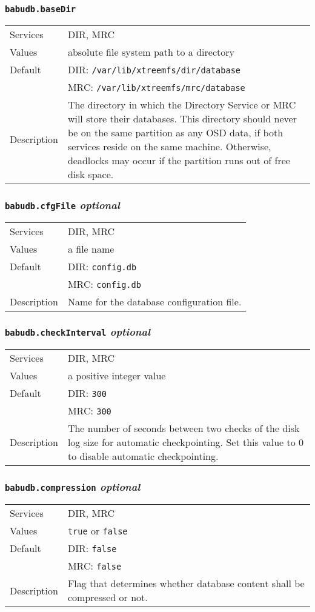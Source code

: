 \documentclass[a4paper,10pt]{book}
\begin{document}
\subsubsection{\texttt{babudb.baseDir}}
\begin{tabular}{lp{10cm}}
 Services & DIR, MRC\\
 Values   & absolute file system path to a directory\\
 Default  & DIR: \texttt{/var/lib/xtreemfs/dir/database}\\
          & MRC: \texttt{/var/lib/xtreemfs/mrc/database}\\
 Description & The directory in which the Directory Service or MRC will store their databases. This directory should never be on the same partition as any OSD data, if both services reside on the same machine. Otherwise, deadlocks may occur if the partition runs out of free disk space.
\end{tabular}

\subsubsection{\texttt{babudb.cfgFile} \textit{optional}}
\begin{tabular}{lp{10cm}}
 Services & DIR, MRC\\
 Values   & a file name\\
 Default  & DIR: \texttt{config.db}\\
          & MRC: \texttt{config.db}\\
 Description & Name for the database configuration file.
\end{tabular}

\subsubsection{\texttt{babudb.checkInterval} \textit{optional}}
\begin{tabular}{lp{10cm}}
 Services & DIR, MRC\\
 Values   & a positive integer value\\
 Default  & DIR: \texttt{300}\\
          & MRC: \texttt{300}\\
 Description & The number of seconds between two checks of the disk log size for automatic checkpointing. Set this value to 0 to disable automatic checkpointing.
\end{tabular}

\subsubsection{\texttt{babudb.compression} \textit{optional}}
\begin{tabular}{lp{10cm}}
 Services & DIR, MRC\\
 Values   & \texttt{true} or \texttt{false}\\
 Default  & DIR: \texttt{false}\\
          & MRC: \texttt{false}\\
 Description & Flag that determines whether database content shall be compressed or not.
\end{tabular}
\end{document}
